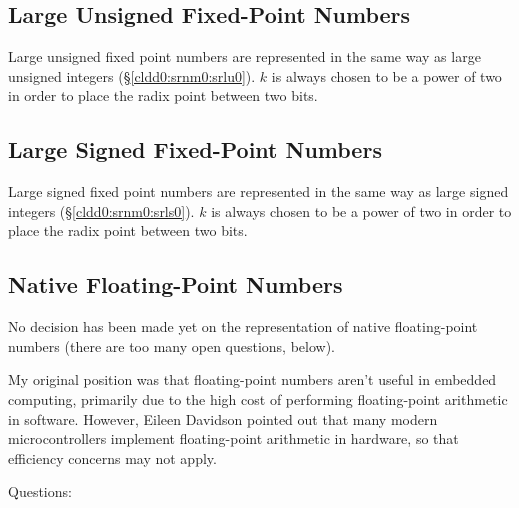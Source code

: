 \subsection{Large Unsigned Fixed-Point Numbers}
\label{cldd0:srnm0:srlu5}

Large unsigned fixed point numbers are represented in the same way as
large unsigned integers (\S{}\ref{cldd0:srnm0:srlu0}).  $k$ is always
chosen to be a power of two in order to place the radix point between two
bits.


\subsection{Large Signed Fixed-Point Numbers}
\label{cldd0:srnm0:srlu6}

Large signed fixed point numbers are represented in the same 
way as large signed integers (\S{}\ref{cldd0:srnm0:srls0}).  
$k$ is always chosen to be a power of two in order to place 
the radix point between two bits.  


\subsection{Native Floating-Point Numbers}
\label{cldd0:srnm0:sfpn0}

No decision has been made yet on the representation of 
native floating-point numbers (there are too many open 
questions, below).  

My original position was that floating-point numbers aren't 
useful in embedded computing, primarily due to the high cost 
of performing floating-point arithmetic in software.  
However, Eileen Davidson 
\cite{bibref:i:EileenADavidson} pointed out that many modern 
microcontrollers implement floating-point arithmetic in 
hardware, so that efficiency concerns may not apply.  

Questions:


